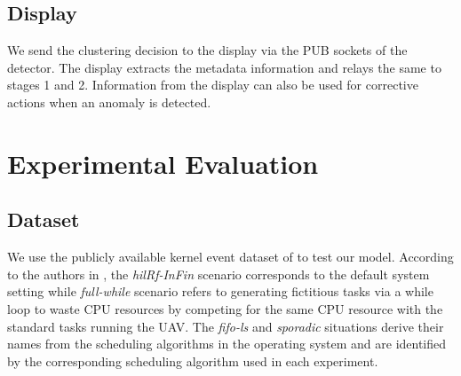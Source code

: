\subsection{Display}
\label{subsec:display}
We send the clustering decision to the display via the PUB sockets of the 
detector. The display extracts the metadata information and relays the same to 
stages 1 and 2. Information from the display can also be used for corrective 
actions when an anomaly is detected. 


\section{Experimental Evaluation}
\label{sec:experiments}
\subsection{Dataset}
We use the publicly available kernel event dataset of \cite{salem2016anomaly} 
to test our model. According to the authors in \cite{salem2016anomaly}, the 
\emph{hilRf-InFin} scenario corresponds to the default system setting while 
\emph{full-while} scenario refers to generating fictitious tasks via a while 
loop to waste CPU resources by competing for the same CPU resource with the 
standard tasks running the UAV. The \emph{fifo-ls} and \emph{sporadic} 
situations derive their names from the scheduling algorithms in the operating 
system and are identified by the corresponding scheduling algorithm used in 
each experiment. 
